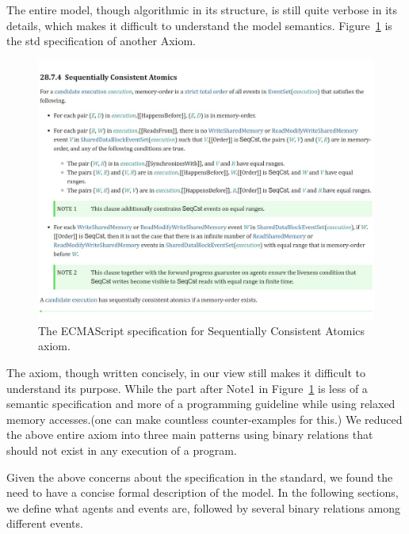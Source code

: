     The entire model, though algorithmic in its structure, is still quite verbose in its details, which makes it difficult to understand the model semantics. 
    Figure~\ref{model:Std3} is the std specification of another Axiom. 
    \begin{figure}[H]
        \centering 
        \includegraphics[scale=0.6]{4.ECMAScriptMemoryModel/ECMAScriptStdSeqCnsAt.pdf}
        \caption{The ECMAScript specification for Sequentially Consistent Atomics axiom.}
        \label{model:Std3}
    \end{figure}
    The axiom, though written concisely, in our view still makes it difficult to understand its purpose. 
    While the part after Note1 in Figure~\ref{model:Std3} is less of a semantic specification and more of a programming guideline while using 
    relaxed memory accesses.(one can make countless counter-examples for this.) 
    We reduced the above entire axiom into three main patterns using binary relations that should not exist in any execution of a program. 

Given the above concerns about the specification in the standard, we found the need to have a concise formal description of the model. 
In the following sections, we define what agents and events are, followed by several binary relations among different events.
